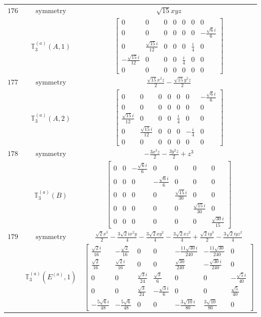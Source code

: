 \documentclass[fleqn,8pt,landscape]{jsarticle}
\begin{document}
\begin{longtable}{ccc}
$ 176 $ & $ \text{symmetry} $ & $ \sqrt{15} x y z $ \\
$  $ & $ \mathbb{T}_{3}^{(a)}(A,1) $ & $ \begin{bmatrix} 0 & 0 & 0 & 0 & 0 & 0 & 0 \\ 0 & 0 & 0 & 0 & 0 & 0 & - \frac{\sqrt{6} i}{6} \\ 0 & \frac{\sqrt{15} i}{12} & 0 & 0 & 0 & \frac{i}{4} & 0 \\ - \frac{\sqrt{15} i}{12} & 0 & 0 & 0 & \frac{i}{4} & 0 & 0 \\ 0 & 0 & 0 & 0 & 0 & 0 & 0 \end{bmatrix} $ \\ \hline
$ 177 $ & $ \text{symmetry} $ & $ \frac{\sqrt{15} x^{2} z}{2} - \frac{\sqrt{15} y^{2} z}{2} $ \\
$  $ & $ \mathbb{T}_{3}^{(a)}(A,2) $ & $ \begin{bmatrix} 0 & 0 & 0 & 0 & 0 & 0 & - \frac{\sqrt{6} i}{6} \\ 0 & 0 & 0 & 0 & 0 & 0 & 0 \\ \frac{\sqrt{15} i}{12} & 0 & 0 & 0 & \frac{i}{4} & 0 & 0 \\ 0 & \frac{\sqrt{15} i}{12} & 0 & 0 & 0 & - \frac{i}{4} & 0 \\ 0 & 0 & 0 & 0 & 0 & 0 & 0 \end{bmatrix} $ \\ \hline
$ 178 $ & $ \text{symmetry} $ & $ - \frac{3 x^{2} z}{2} - \frac{3 y^{2} z}{2} + z^{3} $ \\
$  $ & $ \mathbb{T}_{3}^{(a)}(B) $ & $ \begin{bmatrix} 0 & 0 & - \frac{\sqrt{6} i}{6} & 0 & 0 & 0 & 0 \\ 0 & 0 & 0 & - \frac{\sqrt{6} i}{6} & 0 & 0 & 0 \\ 0 & 0 & 0 & 0 & \frac{\sqrt{15} i}{30} & 0 & 0 \\ 0 & 0 & 0 & 0 & 0 & \frac{\sqrt{15} i}{30} & 0 \\ 0 & 0 & 0 & 0 & 0 & 0 & \frac{\sqrt{30} i}{15} \end{bmatrix} $ \\ \hline
$ 179 $ & $ \text{symmetry} $ & $ \frac{\sqrt{2} x^{3}}{2} - \frac{3 \sqrt{2} i x^{2} y}{4} - \frac{3 \sqrt{2} x y^{2}}{4} - \frac{3 \sqrt{2} x z^{2}}{4} + \frac{\sqrt{2} i y^{3}}{2} - \frac{3 \sqrt{2} i y z^{2}}{4} $ \\
$  $ & $ \mathbb{T}_{3}^{(a)}(E^{(a)},1) $ & $ \begin{bmatrix} \frac{\sqrt{2} i}{16} & - \frac{\sqrt{2}}{16} & 0 & 0 & - \frac{11 \sqrt{30} i}{240} & - \frac{11 \sqrt{30}}{240} & 0 \\ \frac{\sqrt{2}}{16} & \frac{\sqrt{2} i}{16} & 0 & 0 & \frac{\sqrt{30}}{240} & - \frac{\sqrt{30} i}{240} & 0 \\ 0 & 0 & \frac{\sqrt{3} i}{24} & \frac{\sqrt{3}}{6} & 0 & 0 & - \frac{\sqrt{5} i}{40} \\ 0 & 0 & \frac{\sqrt{3}}{24} & - \frac{\sqrt{3} i}{6} & 0 & 0 & \frac{\sqrt{5}}{40} \\ - \frac{5 \sqrt{6} i}{48} & - \frac{5 \sqrt{6}}{48} & 0 & 0 & - \frac{3 \sqrt{10} i}{80} & \frac{3 \sqrt{10}}{80} & 0 \end{bmatrix} $ \\ \hline

\end{longtable}
\end{document}
